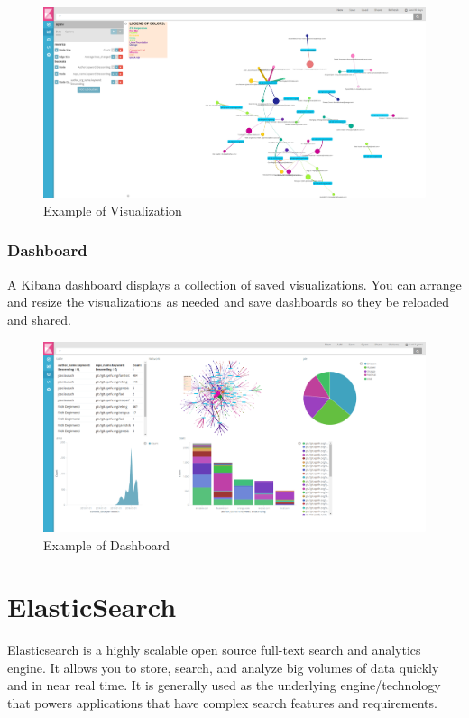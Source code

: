 \documentclass[a4paper, 12pt]{book}
\begin{document}
\begin{figure}[H]
  \centering
  \includegraphics[width=16cm, keepaspectratio]{img/context/Personalize}
  \caption{Example of Visualization}
  \label{fig:visualizeex}
\end{figure}


\subsubsection{Dashboard}
A Kibana dashboard displays a collection of saved visualizations. You can arrange and resize the visualizations as needed and save dashboards so they be reloaded and shared.


\begin{figure}[H]
  \centering
  \includegraphics[width=16cm, keepaspectratio]{img/context/Dashboard}
  \caption{Example of Dashboard}
  \label{fig:dashboardex}
\end{figure}

\section{ElasticSearch}
\label{sec:elasticsearch}
Elasticsearch is a highly scalable open source full-text search and analytics engine. It allows you to store, search, and analyze big volumes of data quickly and in near real time. It is generally used as the underlying engine/technology that powers applications that have complex search features and requirements.
\end{document}
